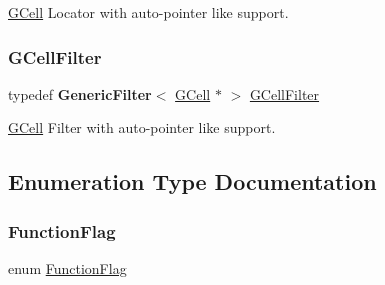 \hyperlink{classKatabatic_1_1GCell}{G\+Cell} Locator with auto-\/pointer like support. \mbox{\label{namespaceKatabatic_a7d07e23d45818a2ae5f6881ce0ec7403}} 
\subsubsection{\texorpdfstring{G\+Cell\+Filter}{GCellFilter}}
{\footnotesize\ttfamily typedef \textbf{ Generic\+Filter}$<$ \hyperlink{classKatabatic_1_1GCell}{G\+Cell} $\ast$ $>$ \hyperlink{namespaceKatabatic_a7d07e23d45818a2ae5f6881ce0ec7403}{G\+Cell\+Filter}}

\hyperlink{classKatabatic_1_1GCell}{G\+Cell} Filter with auto-\/pointer like support. 

\subsection{Enumeration Type Documentation}
\mbox{\label{namespaceKatabatic_a2af2ad6b6441614038caf59d04b3b217}} 
\subsubsection{\texorpdfstring{Function\+Flag}{FunctionFlag}}
{\footnotesize\ttfamily enum \hyperlink{namespaceKatabatic_a2af2ad6b6441614038caf59d04b3b217}{Function\+Flag}}

